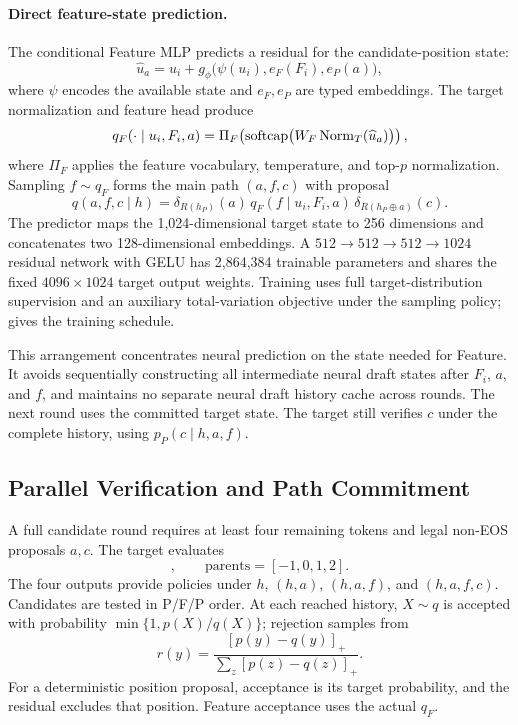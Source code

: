 \paragraph{Direct feature-state prediction.}
The conditional Feature MLP predicts a residual for the candidate-position state:
\begin{equation}
\widehat u_a=u_i+g_\phi\bigl(\psi(u_i),e_F(F_i),e_P(a)\bigr),
\label{eq:state}
\end{equation}
where $\psi$ encodes the available state and $e_F,e_P$ are typed embeddings. The target normalization and feature head produce
\begin{equation}
q_F(\cdot\mid u_i,F_i,a)
=\Pi_F\!\left(\operatorname{softcap}\bigl(W_F\operatorname{Norm}_T(\widehat u_a)\bigr)\right),
\end{equation}
where $\Pi_F$ applies the feature vocabulary, temperature, and top-$p$ normalization. Sampling $f\sim q_F$ forms the main path $(a,f,c)$ with proposal
\begin{equation}
q(a,f,c\mid h)=\delta_{R(h_P)}(a)\,q_F(f\mid u_i,F_i,a)\,
\delta_{R(h_P\oplus a)}(c).
\end{equation}
The predictor maps the 1,024-dimensional target state to 256 dimensions and concatenates two 128-dimensional embeddings. A $512\to512\to512\to1024$ residual network with GELU has 2,864,384 trainable parameters and shares the fixed $4096\times1024$ target output weights. Training uses full target-distribution supervision and an auxiliary total-variation objective under the sampling policy;  gives the training schedule.

This arrangement concentrates neural prediction on the state needed for Feature. It avoids sequentially constructing all intermediate neural draft states after $F_i$, $a$, and $f$, and maintains no separate neural draft history cache across rounds. The next round uses the committed target state. The target still verifies $c$ under the complete history, using $p_P(c\mid h,a,f)$.

\subsection{Parallel Verification and Path Commitment}
A full candidate round requires at least four remaining tokens and legal non-EOS proposals $a,c$. The target evaluates
\begin{equation}
[F_i,a,f,c],\qquad \mathrm{parents}=[-1,0,1,2].
\end{equation}
The four outputs provide policies under $h$, $(h,a)$, $(h,a,f)$, and $(h,a,f,c)$. Candidates are tested in P/F/P order. At each reached history, $X\sim q$ is accepted with probability $\min\{1,p(X)/q(X)\}$; rejection samples from~\cite{leviathan}
\begin{equation}
r(y)=\frac{[p(y)-q(y)]_+}{\sum_z[p(z)-q(z)]_+}.
\label{eq:residual}
\end{equation}
For a deterministic position proposal, acceptance is its target probability, and the residual excludes that position. Feature acceptance uses the actual $q_F$.

